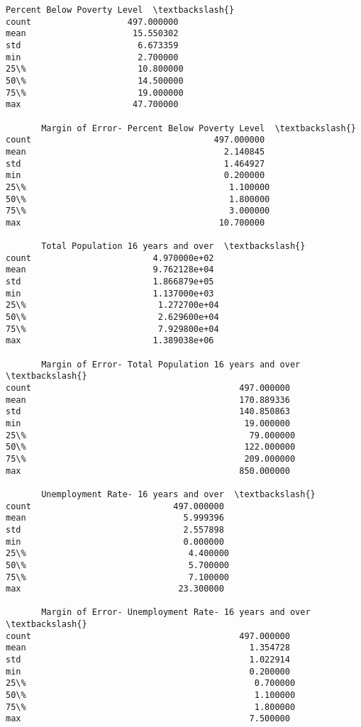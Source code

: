 \documentclass[11pt]{article}
\begin{document}
\begin{tcolorbox}[breakable, size=fbox, boxrule=.5pt, pad at break*=1mm, opacityfill=0]
\begin{Verbatim}[commandchars=\\\{\}]
       Percent Below Poverty Level  \textbackslash{}
count                   497.000000
mean                     15.550302
std                       6.673359
min                       2.700000
25\%                      10.800000
50\%                      14.500000
75\%                      19.000000
max                      47.700000

       Margin of Error- Percent Below Poverty Level  \textbackslash{}
count                                    497.000000
mean                                       2.140845
std                                        1.464927
min                                        0.200000
25\%                                        1.100000
50\%                                        1.800000
75\%                                        3.000000
max                                       10.700000

       Total Population 16 years and over  \textbackslash{}
count                        4.970000e+02
mean                         9.762128e+04
std                          1.866879e+05
min                          1.137000e+03
25\%                          1.272700e+04
50\%                          2.629600e+04
75\%                          7.929800e+04
max                          1.389038e+06

       Margin of Error- Total Population 16 years and over  \textbackslash{}
count                                         497.000000
mean                                          170.889336
std                                           140.850863
min                                            19.000000
25\%                                            79.000000
50\%                                           122.000000
75\%                                           209.000000
max                                           850.000000

       Unemployment Rate- 16 years and over  \textbackslash{}
count                            497.000000
mean                               5.999396
std                                2.557898
min                                0.000000
25\%                                4.400000
50\%                                5.700000
75\%                                7.100000
max                               23.300000

       Margin of Error- Unemployment Rate- 16 years and over  \textbackslash{}
count                                         497.000000
mean                                            1.354728
std                                             1.022914
min                                             0.200000
25\%                                             0.700000
50\%                                             1.100000
75\%                                             1.800000
max                                             7.500000


\end{Verbatim}
\end{tcolorbox}
\end{document}
